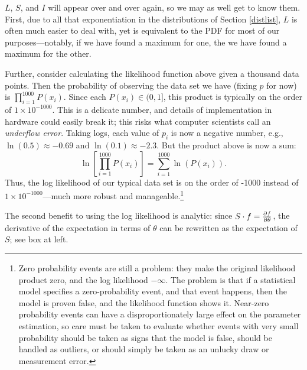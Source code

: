 $L$, $S$, and $I$ will appear over and over again, so we may as well get
to know them. First, due to all that exponentiation in the distributions
of Section \ref{distlist}, $L$ is often much easier to deal with, yet
is equivalent to the PDF for most of our purposes---notably, if we have
found a maximum for one, the we have found a maximum for the other.

Further, consider calculating the likelihood function above given
a thousand data points.  Then the probability of observing the data set
we have (fixing $p$ for now) is $\prod_{i=1}^{1000} P(x_i)$.  Since each
$P(x_i)\in (0,1]$, this product is typically on the order of $1\times
10^{-1000}$. This is a delicate number, and details of implementation in
hardware could easily break it; this risks what computer scientists call an
{\sl underflow error}. Taking logs, each value of $p_i$ is now a negative
number, e.g., $\ln(0.5)\approx -0.69$ and $\ln(0.1)\approx -2.3$.  But the
product above is now a sum: $$\ln\left[\prod_{i=1}^{1000} P(x_i)\right]
= \sum_{i=1}^{1000} \ln\left(P(x_i)\right).$$ Thus, the log likelihood of our typical
data set is on the order of -1000 instead of $1\times 10^{-1000}$---much
more robust and manageable.\footnote{Zero probability events are still
a problem: they make the original likelihood product zero, and the log
likelihood $-\infty$. The problem is that if a statistical model
specifies a zero-probability event, and that event happens, then the
model is proven false, and the likelihood function shows it. Near-zero
probability events can have a disproportionately large effect on the
parameter estimation, so care must be taken to evaluate whether events with very
small probability should be taken as signs that the model is false,
should be handled as outliers, or should simply be taken as an unlucky
draw or measurement error.}

The second benefit to using the log likelihood is analytic: since $S \cdot
f = {\partial f \over \partial \theta}$, the derivative of the expectation
in terms of $\theta$ can be rewritten as the expectation of $S$; see box
at left.

